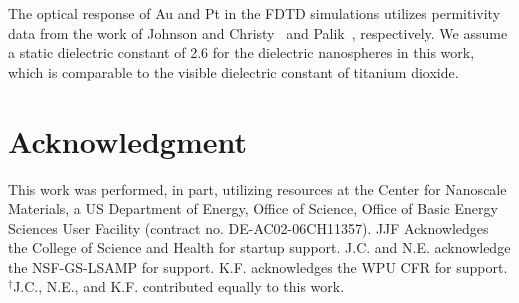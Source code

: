 \documentclass[journal=jpclcd,manuscript=letter]{achemso}
\begin{document}
The optical response of Au and Pt in the FDTD simulations utilizes permitivity data from the work of Johnson and Christy~\cite{JC_PRB_1972} and Palik~\cite{Palik}, respectively.  We assume a static dielectric constant of 2.6 for
the dielectric nanospheres in this work, which is comparable to the visible dielectric constant of titanium dioxide. 

\section{Acknowledgment}
This work was performed, in part, utilizing resources at
the Center for Nanoscale Materials, a US Department of Energy, Office of Science, Office of
Basic Energy Sciences User Facility (contract no. DE-AC02-06CH11357).
JJF Acknowledges the College of Science and Health for startup support.
J.C. and N.E. acknowledge the NSF-GS-LSAMP for support.  K.F. acknowledges the WPU CFR for support.
$^{\dagger}$J.C., N.E., and K.F. contributed equally to this work.
 
\end{document}
